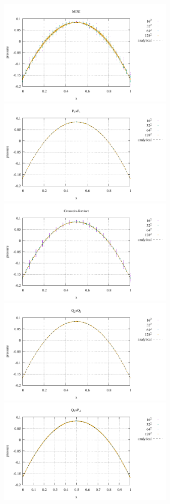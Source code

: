 \newpage
\begin{center}
\includegraphics[width=8.5cm]{python_codes/fieldstone_112/results/exp1/pressMINI}
\includegraphics[width=8.5cm]{python_codes/fieldstone_112/results/exp1/pressP2P1}\\
\includegraphics[width=8.5cm]{python_codes/fieldstone_112/results/exp1/pressCR}
\includegraphics[width=8.5cm]{python_codes/fieldstone_112/results/exp1/pressQ2Q1}\\
\includegraphics[width=8.5cm]{python_codes/fieldstone_112/results/exp1/pressQ2P1}\\

\end{center}

